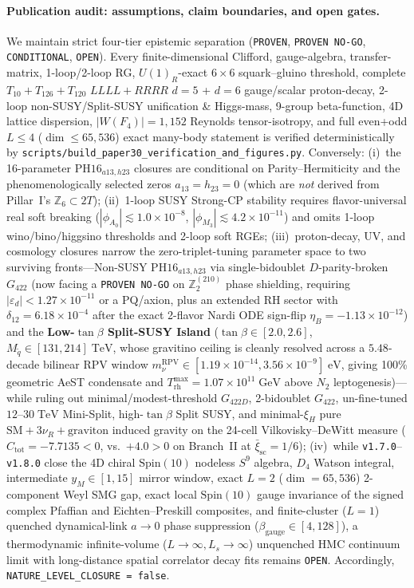 \documentclass[11pt,a4paper]{article}
\begin{document}
\paragraph{Publication audit: assumptions, claim boundaries, and open gates.}
We maintain strict four-tier epistemic separation (\texttt{PROVEN}, \texttt{PROVEN NO-GO}, \texttt{CONDITIONAL}, \texttt{OPEN}). Every finite-dimensional Clifford, gauge-algebra, transfer-matrix, 1-loop/2-loop RG, $U(1)_R$-exact $6\times 6$ squark--gluino threshold, complete $T_{10}+T_{126}+T_{120}$ $LLLL+RRRR$ $d=5$ + $d=6$ gauge/scalar proton-decay, 2-loop non-SUSY/Split-SUSY unification \& Higgs-mass, 9-group beta-function, 4D lattice dispersion, $|W(F_4)|=1{,}152$ Reynolds tensor-isotropy, and full even+odd $L \le 4$ ($\dim \le 65{,}536$) exact many-body statement is verified deterministically by \texttt{scripts/build\_paper30\_verification\_and\_figures.py}. Conversely: (i)~the 16-parameter $\mathrm{PH16}_{a13,h23}$ closures are conditional on Parity--Hermiticity and the phenomenologically selected zeros $a_{13} = h_{23} = 0$ (which are \emph{not} derived from Pillar~I's $\mathbb{Z}_6 \subset 2T$); (ii)~1-loop SUSY Strong-CP stability requires flavor-universal real soft breaking ($|\phi_{A_0}| \lesssim 1.0\times 10^{-8}$, $|\phi_{M_3}| \lesssim 4.2\times 10^{-11}$) and omits 1-loop wino/bino/higgsino thresholds and 2-loop soft RGEs; (iii)~proton-decay, UV, and cosmology closures narrow the zero-triplet-tuning parameter space to two surviving fronts---Non-SUSY $\mathrm{PH16}_{a13,h23}$ via single-bidoublet $D$-parity-broken $G_{422}$ (now facing a \texttt{PROVEN NO-GO} on $\mathbb{Z}_2^{(210)}$ phase shielding, requiring $|\varepsilon_d|<1.27\times 10^{-11}$ or a PQ/axion, plus an extended RH sector with $\delta_{12}=6.18\times 10^{-4}$ after the exact 2-flavor Nardi ODE sign-flip $\eta_B = -1.13\times 10^{-12}$) and the \textbf{Low-$\tan\beta$ Split-SUSY Island} ($\tan\beta \in [2.0, 2.6]$, $M_{\tilde q} \in [131, 214]\;\mathrm{TeV}$, whose gravitino ceiling is cleanly resolved across a $5.48$-decade bilinear RPV window $m_\nu^{\mathrm{RPV}}\in[1.19\times 10^{-14}, 3.56\times 10^{-9}]\;\mathrm{eV}$, giving 100\% geometric AeST condensate and $T_{\mathrm{rh}}^{\max} = 1.07\times 10^{11}\;\mathrm{GeV}$ above $N_2$ leptogenesis)---while ruling out minimal/modest-threshold $G_{422D}$, 2-bidoublet $G_{422}$, un-fine-tuned $12\text{--}30\;\mathrm{TeV}$ Mini-Split, high-$\tan\beta$ Split SUSY, and minimal-$\xi_H$ pure $\mathrm{SM}+3\nu_R+\text{graviton}$ induced gravity on the 24-cell Vilkovisky--DeWitt measure ($C_{\mathrm{tot}}=-7.7135<0$, vs.\ $+4.0>0$ on Branch~II at $\bar\xi_{\mathrm{sc}}=1/6$); (iv)~while \texttt{v1.7.0}--\texttt{v1.8.0} close the 4D chiral $\mathrm{Spin}(10)$ nodeless $S^9$ algebra, $D_4$ Watson integral, intermediate $y_M\in[1,15]$ mirror window, exact $L=2$ ($\dim=65{,}536$) 2-component Weyl SMG gap, exact local $\mathrm{Spin}(10)$ gauge invariance of the signed complex Pfaffian and Eichten--Preskill composites, and finite-cluster ($L=1$) quenched dynamical-link $a\to 0$ phase suppression ($\beta_{\mathrm{gauge}}\in[4,128]$), a thermodynamic infinite-volume ($L\to\infty, L_s\to\infty$) unquenched HMC continuum limit with long-distance spatial correlator decay fits remains \texttt{OPEN}. Accordingly, \texttt{NATURE\_LEVEL\_CLOSURE = false}.
\end{document}
